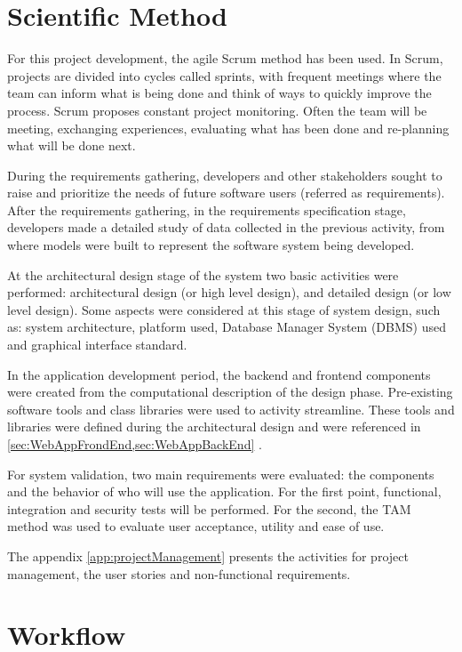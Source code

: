 \label{chap:useExample}

\acresetall 

\section{Scientific Method}\label{sec:method}

For this project development, the agile Scrum method has been used. In Scrum, projects are divided into cycles called sprints, with frequent meetings where the team can inform what is being done and think of ways to quickly improve the process. Scrum proposes constant project monitoring. Often the team will be meeting, exchanging experiences, evaluating what has been done and re-planning what will be done next.

During the requirements gathering, developers and other stakeholders sought to raise and prioritize the needs of future software users (referred as requirements). After the requirements gathering, in the requirements specification stage, developers made a detailed study of data collected in the previous activity, from where models were built to represent the software system being developed.

At the architectural design stage of the system two basic activities were performed: architectural design (or high level design), and detailed design (or low level design). Some aspects were considered at this stage of system design, such as: system architecture, platform used, Database Manager System (DBMS) used and graphical interface standard.

In the application development period, the backend and frontend components were created from the computational description of the design phase. Pre-existing software tools and class libraries were used to activity streamline. These tools and libraries were defined during the architectural design and were referenced in \cref{sec:WebAppFrondEnd,sec:WebAppBackEnd} .

For system validation, two main requirements were evaluated: the components and the behavior of who will use the application. For the first point, functional, integration and security tests will be performed. For the second, the \acf{TAM} method was used to evaluate user acceptance, utility and ease of use.

The appendix \ref{app:projectManagement} presents the activities for project management, the user stories and non-functional requirements. 


\section{Workflow}\label{sec:workflow}